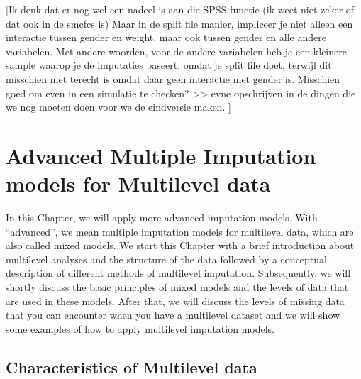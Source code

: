 \documentclass[]{book}
\theoremstyle{definition}
\theoremstyle{definition}
\theoremstyle{definition}
\theoremstyle{remark}
\begin{document}
{[}Ik denk dat er nog wel een nadeel is aan die SPSS functie (ik weet
niet zeker of dat ook in de smcfcs is) Maar in de split file manier,
impliceer je niet alleen een interactie tussen gender en weight, maar
ook tussen gender en alle andere variabelen. Met andere woorden, voor de
andere variabelen heb je een kleinere sample waarop je de imputaties
baseert, omdat je split file doet, terwijl dit misschien niet terecht is
omdat daar geen interactie met gender is. Misschien goed om even in een
simulatie te checken? \textgreater{}\textgreater{} evne opschrijven in
de dingen die we nog moeten doen voor we de eindversie maken. {]}

\chapter{Advanced Multiple Imputation models for Multilevel
data}\label{advanced-multiple-imputation-models-for-multilevel-data}

In this Chapter, we will apply more advanced imputation models. With
``advanced'', we mean multiple imputation models for multilevel data,
which are also called mixed models. We start this Chapter with a brief
introduction about multilevel analyses and the structure of the data
followed by a conceptual description of different methods of multilevel
imputation. Subsequently, we will shortly discuss the basic principles
of mixed models and the levels of data that are used in these models.
After that, we will discuss the levels of missing data that you can
encounter when you have a multilevel dataset and we will show some
examples of how to apply multilevel imputation models.

\section{Characteristics of Multilevel
data}\label{characteristics-of-multilevel-data}
\end{document}
